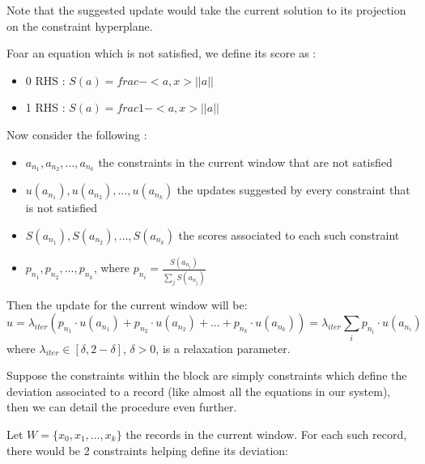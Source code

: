 \documentclass[a4paper,twoside,10pt]{report}
\begin{document}
	Note that the suggested update would take the current solution to its projection on the constraint hyperplane.
	
	Foar an equation which is not satisfied, we define its score as :
	\begin{itemize}
		\item 0 RHS : \(S(a) = frac{-<a, x>}{||a||}\)
		\item 1 RHS : \(S(a) = frac{1 - <a, x>}{||a||}\)
	\end{itemize}
	
	Now consider the following :
	
	\begin{itemize}
		\item \(a_{n_1}, a_{n_2},\ldots, a_{n_k}\) the constraints in the current window that are not satisfied
		\item \(u(a_{n_1}), u(a_{n_2}),\ldots, u(a_{n_k})\) the updates suggested by every constraint that is not satisfied
		\item \(S(a_{n_1}), S(a_{n_2}),\ldots, S(a_{n_k})\) the scores associated to each such constraint
		\item \(p_{n_1}, p_{n_2},\ldots,p_{n_k}\), where \(p_{n_i} = \frac{S(a_{n_i})}{\sum_j {S(a_{n_j})}}\)
	\end{itemize}

	Then the update for the current window will be:	
	\[
		u = \lambda_{iter} (p_{n_1} \cdot u(a_{n_1}) + p_{n_2} \cdot u(a_{n_2}) + ... + p_{n_k} \cdot u(a_{n_k})) = \lambda_{iter} \sum_i {p_{n_i} \cdot u(a_{n_i})}
	\]
	where \(\lambda_{iter}\in [\delta, 2-\delta]\), \(\delta > 0\), is a relaxation parameter.
	
	Suppose the constraints within the block are simply constraints which define the deviation associated to a record (like almost all the equations
in our system), then we can detail the procedure even further. 
	
	Let \(W = \{x_0, x_1, \ldots, x_k\}\) the records in the current window. For each such record, there would be 2 constraints helping define its deviation:
	
\end{document}
